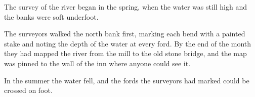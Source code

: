 \documentclass{article}
\begin{document}
The survey of the river began in the spring, when the water was still high and the banks were soft underfoot.

\begin{tcolorbox}[colframe=blue!50!black, colback=white, arc=2mm, boxrule=0.9pt, left=1mm, right=1mm, top=2mm, bottom=2mm]
The surveyors walked the north bank first, marking each bend with a painted stake and noting the depth of the water at every
ford. By the end of the month they had mapped the river from the mill to the old stone bridge, and the map was pinned to the
wall of the inn where anyone could see it.
\end{tcolorbox}

\vspace{3cm}

In the summer the water fell, and the fords the surveyors had marked could be crossed on foot.
\end{document}
